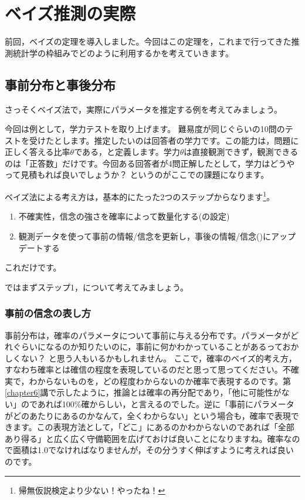 \documentclass{ltjbook}
\begin{document}
\chapter{ベイズ推測の実際}
前回，ベイズの定理を導入しました。今回はこの定理を，これまで行ってきた推測統計学の枠組みでどのように利用するかを考えていきます。


\section{事前分布と事後分布}
さっそくベイズ法で，実際にパラメータを推定する例を考えてみましょう。

今回は例として，学力テストを取り上げます。
難易度が同じぐらいの10問のテストを受けたとします。推定したいのは回答者の学力です。この能力は，問題に正しく答える比率$\theta$である，と定義します。学力$\theta$は直接観測できず，観測できるのは「正答数」だけです。今回ある回答者が4問正解したとして，学力はどうやって見積もれば良いでしょうか？ というのがここでの課題になります。

ベイズ法による考え方は，基本的にたった2つのステップからなります\footnote{帰無仮説検定より少ない！やったね！}。
\begin{enumerate}
    \item 不確実性，信念の強さを確率によって数量化する(の設定)
    \item 観測データを使って事前の情報/信念を更新し，事後の情報/信念()にアップデートする
\end{enumerate}
これだけです。

ではまずステップ1，について考えてみましょう。
\subsection{事前の信念の表し方}
事前分布は，確率のパラメータについて事前に与える分布です。パラメータがどれぐらいになるのか知りたいのに，事前に何かわかっていることがあるっておかしくない？ と思う人もいるかもしれません。
ここで，確率のベイズ的考え方，すなわち確率とは確信の程度を表現しているのだと思って思ってください。不確実で，わからないものを，どの程度わからないのか確率で表現するのです。第\ref{chapter6}講で示したように，推論とは確率の再分配であり，「他に可能性がない」のであれば100\%確からしい，と言えるのでした。逆に「事前にパラメータがどのあたりにあるのかなんて，全くわからない」という場合も，確率で表現できます。この表現方法として，「どこ」にあるのかわからないのであれば「全部あり得る」と広く広く守備範囲を広げておけば良いことになりますね。確率なので面積は1.0でなければなりませんが，その分うすく伸ばすように考えれば良いのです。
\end{document}
